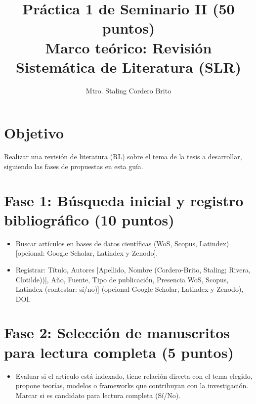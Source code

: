 \documentclass[12pt]{article}
\title{\textbf{Práctica 1 de Seminario II (50 puntos) \\ Marco teórico: Revisión Sistemática de Literatura (SLR)}}
\author{Mtro. Staling Cordero Brito}
\date{}
\begin{document}
\maketitle

\section*{Objetivo}
Realizar una revisión de literatura (RL) sobre el tema de la tesis a desarrollar, siguiendo las fases de propuestas en esta guía.

\section*{Fase 1: Búsqueda inicial y registro bibliográfico (10 puntos)}
\begin{itemize}
  \item Buscar artículos en bases de datos científicas (WoS, Scopus, Latindex) [opcional: Google Scholar, Latindex y Zenodo].
  \item Registrar: Título, Autores [Apellido, Nombre (Cordero-Brito, Staling; Rivera, Clotilde))], Año, Fuente, Tipo de publicación, Presencia WoS, Scopus, Latindex (contestar: sí/no)] (opcional Google Scholar, Latindex y Zenodo), DOI.
\end{itemize}

\section*{Fase 2: Selección de manuscritos para lectura completa (5 puntos)}
\begin{itemize}
  \item Evaluar si el artículo está indexado, tiene relación directa con el tema elegido, propone teorías, modelos o frameworks que contribuyan con la investigación.\\
  
  Marcar si es candidato para lectura completa (Sí/No).
\end{itemize}
\end{document}

